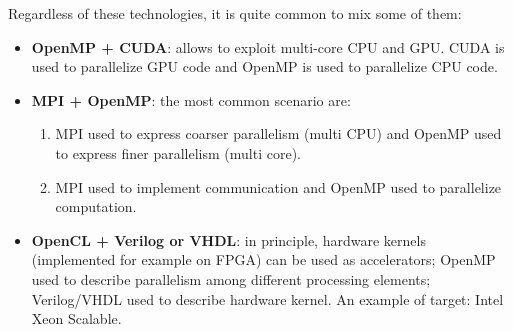 Regardless of these technologies, it is quite common to mix some of them:
\begin{itemize}
    \item \textbf{OpenMP + CUDA}: allows to exploit multi-core CPU and GPU. CUDA is used to parallelize GPU code and OpenMP is used to parallelize CPU code.
    
    \item \textbf{MPI + OpenMP}: the most common scenario are:
    \begin{enumerate}
        \item MPI used to express coarser parallelism (multi CPU) and OpenMP used to express finer parallelism (multi core).
        \item MPI used to implement communication and OpenMP used to parallelize computation.
    \end{enumerate}

    \item \textbf{OpenCL + Verilog or VHDL}: in principle, hardware kernels (implemented for example on FPGA) can be used as accelerators; OpenMP used to describe parallelism among different processing elements; Verilog/VHDL used to describe hardware kernel. An example of target: Intel Xeon Scalable.
\end{itemize}